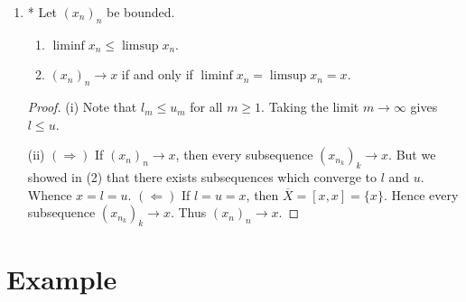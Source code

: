 \begin{enumerate}[label = (\arabic*)]
{\begin{proof}
\begin{equation*}
\begin{split}
                        N = n_1 + 1 &\implies (\exists n_2 \in \bfN)(n_2 > n_1 \hspace{4pt}\land\hspace{4pt} l_2 \leq x_{n_2} < l_2 + \frac{1}{2})\\
                        N = n_2 + 1 &\implies (\exists n_3 \in \bfN)(n_3 > n_2 \hspace{4pt}\land\hspace{4pt} l_3 \leq x_{n_3} < l_3 + \frac{1}{3})\\
                        &\vdots
                    \end{split}
                    \end{equation*}
                Inductively:
                    \begin{equation*}
                    \begin{split}
                        l_k \leq x_{n_k} < l_k + \frac{1}{k}
                        & \implies \lim_{k \rightarrow \infty} l_k \leq \lim_{k \rightarrow \infty} x_{n_k} < \lim_{k \rightarrow \infty} l_k + \frac{1}{k} \\
                        & \implies l \leq \lim_{k \rightarrow \infty} x_{n_k} < l.
                    \end{split}
                    \end{equation*}
                By the squeeze theorem, $(x_{n_k})_k \rightarrow l$. Hence $l,u \in \overline{X}$.
            \end{proof}}

        \item{\color{red}*} Let $(x_n)_n$ be bounded.
            \begin{enumerate}[label = (\roman*)]
                \item $\liminf x_n \leq \limsup x_n$.
                \item $(x_n)_n \rightarrow x$ if and only if $\liminf x_n = \limsup x_n = x$.
            \end{enumerate}
            {\color{red} \begin{proof}
                (i) Note that $l_m \leq u_m$ for all $m \geq 1$. Taking the limit $m \rightarrow \infty$ gives $l \leq u$.

                (ii) $(\Rightarrow)$ If $(x_n)_n \rightarrow x$, then every subsequence $(x_{n_k})_k \rightarrow x$. But we showed in (2) that there exists subsequences which converge to $l$ and $u$. Whence $x = l = u$. $(\Leftarrow)$ If $l = u = x$, then $\overline{X} = [x,x] = \{x\}$. Hence every subsequence $(x_{n_k})_k \rightarrow x$. Thus $(x_n)_n \rightarrow x$.
                
            \end{proof}}
    \end{enumerate}
\section*{Example}